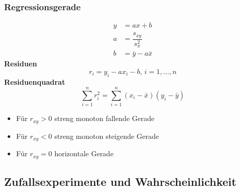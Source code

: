 \documentclass[
	ngerman,
	accentcolor=9c,%
	type=intern,
	marginpar=false
	]{tudapub}
\begin{document}
            \subsubsection{Regressionsgerade}
                \begin{align*}
                    y &= ax + b\\
                    a &= \dfrac{s_{xy}}{s_x^2}\\
                    b &= \bar{y} - a \bar{x}
                \end{align*}
                \textbf{Residuen}
                \begin{equation*}
                    r_i = y_i - a x_i - b \mbox{, }i = 1,\dots, n
                \end{equation*}
                \textbf{Residuenquadrat}
                \begin{equation*}
                    \sum_{i=1}^n r_i^2 = \sum_{i=1}^n (x_i - \bar{x})(y_i - \bar{y})
                \end{equation*}
                \begin{itemize}
                    \item Für $r_{xy} > 0$ streng monoton fallende Gerade
                    \item Für $r_{xy} < 0$ streng monoton steigende Gerade
                    \item Für $r_{xy} = 0$ horizontale Gerade
                \end{itemize}
                \newpage
        \subsection{Zufallsexperimente und Wahrscheinlichkeit}
\end{document}
